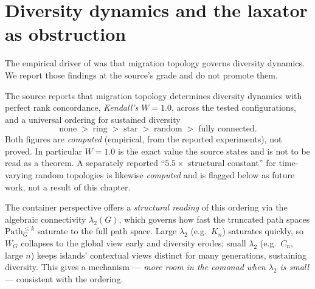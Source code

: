 \section{Diversity dynamics and the laxator as obstruction}
\label{sec:ga-diversity}

The empirical driver of \cite{langer-va-ga} was that migration topology governs
diversity dynamics. We report those findings at the source's grade and do not
promote them.

\begin{remark}
\label{rem:ga-empirical}
The source reports that migration topology determines diversity dynamics with
perfect rank concordance, \emph{Kendall's $W=1.0$}, across the tested
configurations, and a universal ordering for sustained diversity
\[
   \text{none} \;>\; \text{ring} \;>\; \text{star} \;>\; \text{random}
   \;>\; \text{fully connected}.
\]
Both figures are \emph{computed} (empirical, from the reported experiments), not
proved. In particular $W=1.0$ is the exact value the source states and is not to
be read as a theorem. A separately reported ``$5.5\times$ structural constant''
for time-varying random topologies is likewise \emph{computed} and is flagged
below as future work, not a result of this chapter.
\end{remark}

The container perspective offers a \emph{structural reading} of this ordering
via the algebraic connectivity $\lambda_2(G)$, which governs how fast the
truncated path spaces $\mathrm{Path}_G^{\le k}$ saturate to the full path space.
Large $\lambda_2$ (e.g.\ $K_n$) saturates quickly, so $W_G$ collapses to the
global view early and diversity erodes; small $\lambda_2$ (e.g.\ $C_n$, large
$n$) keeps islands' contextual views distinct for many generations, sustaining
diversity. This gives a mechanism --- \emph{more room in the comonad when
$\lambda_2$ is small} --- consistent with the ordering.

